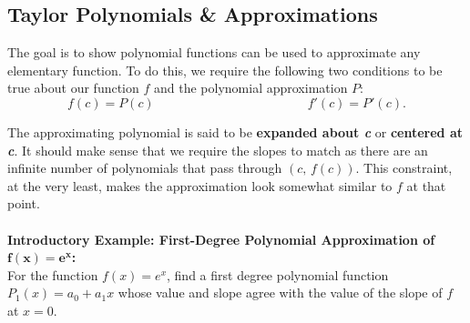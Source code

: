 \subsection*{Taylor Polynomials \& Approximations}
The goal is to show polynomial functions can be used to approximate any elementary function. To do this, we require the following two conditions to be true about our function $f$ and the polynomial approximation $P$:
\[f(c)=P(c)\hspace{2in}f'(c)=P'(c).\]

\begin{center}
\end{center}


The approximating polynomial is said to be \textbf{expanded about \textit{c}} or \textbf{centered at \textit{c}}. It should make sense that we require the slopes to match as there are an infinite number of polynomials that pass through $(c,\,f(c))$. This constraint, at the very least, makes the approximation look somewhat similar to $f$ at that point.\\
\\

\noindent\textbf{Introductory Example: First-Degree Polynomial Approximation of $\mathbf{f(x)=e^{x}}$: }\\
For the function $f(x)=e^x$, find a first degree polynomial function $P_1(x)=a_0+a_1 x$ whose value and slope agree with the value of the slope of $f$ at $x=0$.





